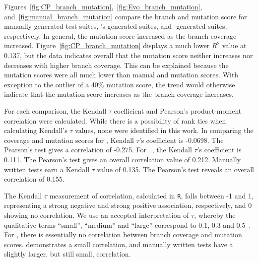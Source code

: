 Figures~\ref{fig:CP_branch_mutation},~\ref{fig:Evo_branch_mutation}, and~\ref{fig:manual_branch_mutation} compare the branch and mutation score for manually generated test suites, \evo's-generated suites, and \codepro-generated suites, respectively.  In general, the mutation score increased as the branch coverage increased.  Figure~\ref{fig:CP_branch_mutation} displays a much lower $R^2$ value at 0.137, but the data indicates overall that the mutation score neither increases nor decreases with higher branch coverage. This can be explained because the mutation scores were all much lower than manual and \evo mutation scores. With exception to the outlier of a 40\% mutation score, the trend would otherwise indicate that the mutation score increases as the branch coverage increases.

  For each comparison, the Kendall $\tau$ coefficient and Pearson's product-moment correlation were calculated.  While there is a possibility of rank ties when calculating Kendall's $\tau$ values, none were identified in this work.  In comparing the coverage and mutation scores for \codepro, Kendall $\tau$'s coefficient is -0.0698.  The Pearson's test gives a correlation of -0.275. 
For ~\evo, the Kendall $\tau$'s coefficient is 0.111.  The Pearson's test gives an overall correlation value of 0.212.  
Manually written tests earn a Kendall $\tau$ value of 0.135.  The Pearson's test reveals an overall correlation of 0.155.  

The Kendall $\tau$ measurement of correlation, calculated in {\tt R}, falls between -1 and 1, representing a strong negative and strong positive association, respectively, and 0 showing no correlation. We use an accepted interpretation of $\tau$, whereby the qualitative terms ``small'', ``medium'' and ``large'' correspond to 0.1, 0.3 and 0.5~\cite{kraemer2003}.  For \codepro, there is essentially no correlation between branch coverage and mutation scores.  \evo demonstrates a small correlation, and manually written tests have a slightly larger, but still small, correlation. 

